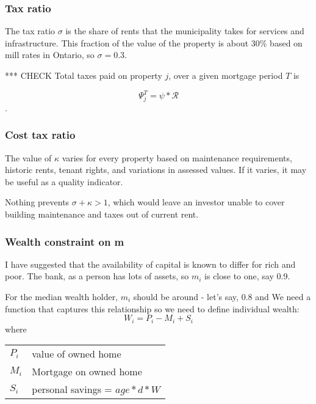 \subsubsection{Tax ratio}\label{SS:taxratio} 
The tax ratio $\sigma$ is the share of rents that the municipality takes for services and infrastructure. This fraction of the value of the property is about 30\% based on mill rates in Ontario,  so $\sigma = 0.3$. %

*** CHECK Total taxes paid on  property $j$, over a given mortgage period $T$ is 

\[\Psi_j^T = \psi * \mathcal{R}\].  



\subsubsection{Cost tax ratio}\label{SS:costratio} 
The value of $\kappa$  varies for every property based on maintenance requirements, historic rents, tenant rights, and variations in assessed values. If it varies, it may be useful as a quality indicator.


Nothing prevents $\sigma+\kappa >1$, which would leave an investor unable to cover building maintenance and taxes out of current rent. 



\subsubsection{Wealth constraint on m} \label{SS:MWealthConstraint}


I have suggested that the availability of  capital is known to differ for rich and poor. 
The bank, as a person has lots of assets, so $m_i$ is close to one, say 0.9. 

For the median wealth holder, $m_i$ should be around - let's say, 0.8 and  
We need a function that captures this relationship so we need to define individual wealth:
\[W_i= P_i -M_i  +S_i\]
where 

\begin{tabular}{ll}
$P_i$ & value of owned home\\
$M_i$ & Mortgage on owned home\\
$S_i$ & personal savings = $age*d*W$\\
\end{tabular}


